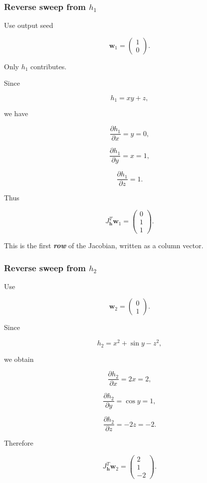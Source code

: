 \documentclass[10pt]{article}
\begin{document}
\subsubsection*{Reverse sweep from $h_1$}
Use output seed

\[
\mathbf w_1
=
\begin{pmatrix}1\\0\end{pmatrix}.
\]

Only $h_1$ contributes.

Since

\[
h_1=xy+z,
\]

we have

\[
\frac{\partial h_1}{\partial x}=y=0,
\]

\[
\frac{\partial h_1}{\partial y}=x=1,
\]

\[
\frac{\partial h_1}{\partial z}=1.
\]

Thus

\[
{
J_{\mathbf h}^T\mathbf w_1
=
\begin{pmatrix}
0\\1\\1
\end{pmatrix}
}.
\]

This is the first \textbf{\textit{row}} of the Jacobian, written as a column vector.

\subsubsection*{Reverse sweep from $h_2$}
Use

\[
\mathbf w_2
=
\begin{pmatrix}0\\1\end{pmatrix}.
\]

Since

\[
h_2=x^2+\sin y-z^2,
\]

we obtain

\[
\frac{\partial h_2}{\partial x}=2x=2,
\]

\[
\frac{\partial h_2}{\partial y}=\cos y=1,
\]

\[
\frac{\partial h_2}{\partial z}=-2z=-2.
\]

Therefore

\[
{
J_{\mathbf h}^T\mathbf w_2
=
\begin{pmatrix}
2\\1\\-2
\end{pmatrix}
}.
\]
\end{document}
